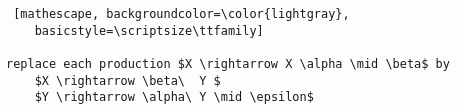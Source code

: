 \documentclass[
    border=0.2cm,
    convert={density=600}
]{standalone}
\begin{document}
\begin{lstlisting} [mathescape, backgroundcolor=\color{lightgray},
	basicstyle=\scriptsize\ttfamily]
	
replace each production $X \rightarrow X \alpha \mid \beta$ by
	$X \rightarrow \beta\  Y $
	$Y \rightarrow \alpha\ Y \mid \epsilon$
     	 	
	
\end{lstlisting}
\end{document}

